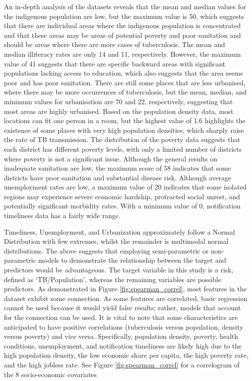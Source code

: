 An in-depth analysis of the datasets reveals that the mean and median values for the indigenous population are low, but the maximum value is 50, which suggests that there are individual areas where the indigenous population is concentrated and that these areas may be areas of potential poverty and poor sanitation and should be areas where there are more cases of tuberculosis. The mean and median illiteracy rates are only 14 and 11, respectively. However, the maximum value of 41 suggests that there are specific backward areas with significant populations lacking access to education, which also suggests that the area seems poor and has poor sanitation. There are still some places that are less urbanised, where there may be more occurrences of tuberculosis, but the mean, median, and minimum values for urbanisation are 70 and 22, respectively, suggesting that most areas are highly urbanised. Based on the population density data, most locations can fit one person in a room, but the highest value of 1.6 highlights the existence of some places with very high population densities, which sharply raise the rate of TB transmission. The distribution of the poverty data suggests that each district has different poverty levels, with only a limited number of districts where poverty is not a significant issue. Although the general results on inadequate sanitation are low, the maximum score of 58 indicates that some districts have poor sanitation and substantial disease risk. Although average unemployment rates are low, a maximum value of 20 indicates that some isolated regions may experience severe economic hardship, protracted social unrest, and potentially significant morbidity rates. With a minimum value of 0, notification timeliness data has a fairly wide range.

Timeliness, Unemployment, and Urbanization approximately follow a Normal Distribution with few extremes, whilst the remainder is multimodal normal distributions. The above suggests that employing semi-parametric or non-parametric models to demonstrate the relationship between the target and predictors would be advantageous. The target variable in this study is a risk, defined as `TB/Population', whereas the remaining variables are possible predictors. As demonstrated in Figure \ref{fig:spearman_correl}, most features in the dataset exhibit some connection. As some features are correlated, basic regression cannot be used because it would yield false results; rather, models that account for the connection can be used. It is vital to note that some characteristics are anticipated to have positive correlations (tuberculosis versus population, density versus poverty) and vice versa. Specifically, population density, poverty, health conditions, unemployment, and notification timeliness are likely high due to the high population density, the low economic share per capita, the high poverty rate, and the high jobless rate. See Figure \ref{fig:spearman_correl} for a correlogram of the 8 socio-economic covariates


